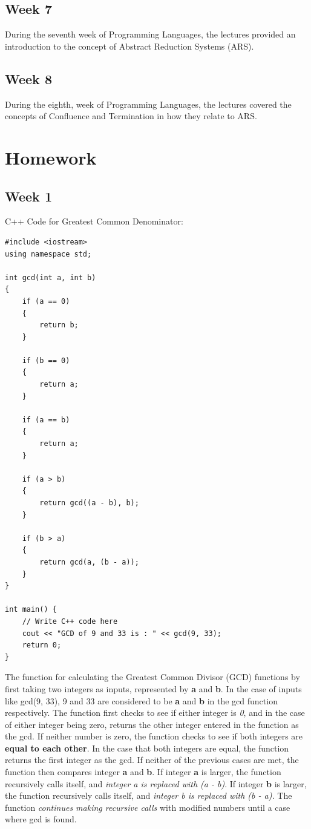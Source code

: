 \documentclass{article}
\theoremstyle{theorem}
\theoremstyle{definition}
\theoremstyle{remark}
\begin{document}
\subsection{Week 7} During the seventh week of Programming Languages, the lectures provided an introduction to the concept of Abstract Reduction Systems (ARS).
\subsection{Week 8} During the eighth, week of Programming Languages, the lectures covered the concepts of Confluence and Termination in how they relate to ARS.
\section{Homework}\label{homework}
\subsection{Week 1}

C++ Code for Greatest Common Denominator:
\begin{lstlisting}
#include <iostream>
using namespace std;

int gcd(int a, int b)
{
    if (a == 0)
    {
        return b;
    }
    
    if (b == 0)
    {
        return a;
    }
    
    if (a == b)
    {
        return a;
    }
    
    if (a > b)
    {
        return gcd((a - b), b);
    }
    
    if (b > a)
    {
        return gcd(a, (b - a));
    }
}

int main() {
    // Write C++ code here
    cout << "GCD of 9 and 33 is : " << gcd(9, 33);
    return 0;
}
\end{lstlisting}
    
    The function for calculating the Greatest Common Divisor (GCD) functions by first taking two integers as inputs, represented by \textbf{a} and \textbf{b}. In the case of inputs like gcd(9, 33), 9 and 33 are considered to be \textbf{a} and \textbf{b} in the gcd function respectively. The function first checks to see if either integer is \textit{0}, and in the case of either integer being zero, returns the other integer entered in the function as the gcd. If neither number is zero, the function checks to see if both integers are \textbf{equal to each other}. In the case that both integers are equal, the function returns the first integer as the gcd. If neither of the previous cases are met, the function then compares integer \textbf{a} and \textbf{b}. If integer \textbf{a} is larger, the function recursively calls itself, and \textit{integer a is replaced with (a - b)}. If integer \textbf{b} is larger, the function recursively calls itself, and \textit{integer b is replaced with (b - a).} The function \textit{continues making recursive calls} with modified numbers until a case where gcd is found.
\end{document}
